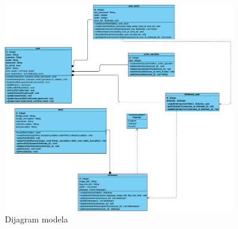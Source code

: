 				\begin{figure}[H]
					\includegraphics[width=0.9\textwidth]{dijagrami/slika3.jpg} 
					\centering
					\caption{Dijagram modela}
					\label{fig:class_diagram}
				\end{figure}			
			\eject
			
